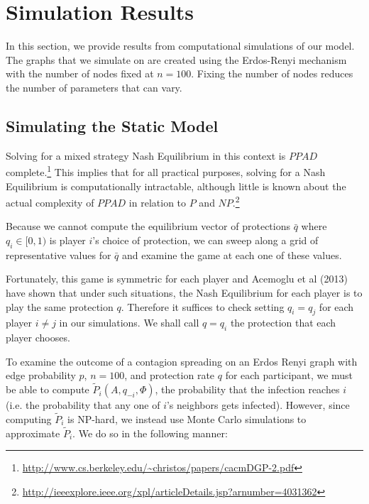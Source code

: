 \documentclass{article}
\theoremstyle{plain}
\begin{document}
\section{Simulation Results}

In this section, we provide results from computational simulations of our model. The graphs that we simulate on are created using the Erdos-Renyi mechanism with the number of nodes fixed at $n = 100$. Fixing the number of nodes reduces the number of parameters that can vary.

\subsection{Simulating the Static Model}

  Solving for a mixed strategy Nash Equilibrium in this context is $PPAD$ complete.\footnote{\url{http://www.cs.berkeley.edu/~christos/papers/cacmDGP-2.pdf}} This implies that for all practical purposes, solving for a Nash Equilibrium is computationally intractable, although little is known about the actual complexity of $PPAD$ in relation to $P$ and $NP$.\footnote{\url{http://ieeexplore.ieee.org/xpl/articleDetails.jsp?arnumber=4031362}} 

Because we cannot compute the equilibrium vector of protections $\bar{q}$ where $q_i \in [0,1)$ is player $i$'s choice of protection, we can sweep along a grid of representative values for $\bar{q}$ and examine the game at each one of these values.

Fortunately, this game is symmetric for each player and Acemoglu et al (2013) have shown that under such situations, the Nash Equilibrium for each player is to play the same protection $q$. Therefore it suffices to check setting $q_i = q_j$ for each player $i \neq j$ in our simulations. We shall call $q = q_i$ the protection that each player chooses.

To examine the outcome of a contagion spreading on an Erdos Renyi graph with edge probability $p$, $n = 100$, and protection rate $q$ for each participant, we must be able to compute $\tilde{P}_i(A, q_{-i}, \Phi)$, the probability that the infection reaches $i$ (i.e. the probability that any one of $i$'s neighbors gets infected). However, since computing $\tilde{P}_i$ is NP-hard, we instead use Monte Carlo simulations to approximate $\tilde{P}_i$. We do so in the following manner:
\end{document}
